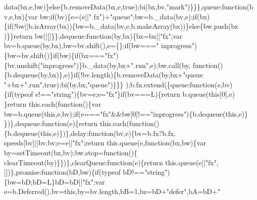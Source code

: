 \begin{DoxyCode}
      data(bx,e,bw)\}\textcolor{keywordflow}{else}\{b.removeData(bx,e,true);bi(bx,bv,\textcolor{stringliteral}{"mark"})\}\}\},queue:\textcolor{keyword}{function}(bv,e,bx)\{var bw;\textcolor{keywordflow}{if}(bv)\{e=(e||\textcolor{stringliteral}{"
      fx"})+\textcolor{stringliteral}{"queue"};bw=b.\_data(bv,e);\textcolor{keywordflow}{if}(bx)\{\textcolor{keywordflow}{if}(!bw||b.isArray(bx))\{bw=b.\_data(bv,e,b.makeArray(bx))\}\textcolor{keywordflow}{else}\{bw.push(bx
      )\}\}\textcolor{keywordflow}{return} bw||[]\}\},dequeue:\textcolor{keyword}{function}(by,bx)\{bx=bx||\textcolor{stringliteral}{"fx"};var bv=b.queue(by,bx),bw=bv.shift(),e=\{\};\textcolor{keywordflow}{if}(bw===\textcolor{stringliteral}{"
      inprogress"})\{bw=bv.shift()\}\textcolor{keywordflow}{if}(bw)\{\textcolor{keywordflow}{if}(bx===\textcolor{stringliteral}{"fx"})\{bv.unshift(\textcolor{stringliteral}{"inprogress"})\}b.\_data(by,bx+\textcolor{stringliteral}{".run"},e);bw.call(by,\textcolor{keyword}{
      function}()\{b.dequeue(by,bx)\},e)\}\textcolor{keywordflow}{if}(!bv.length)\{b.removeData(by,bx+\textcolor{stringliteral}{"queue "}+bx+\textcolor{stringliteral}{".run"},\textcolor{keyword}{true});bi(by,bx,\textcolor{stringliteral}{"queue"})\}\}\}
      );b.fn.extend(\{queue:\textcolor{keyword}{function}(e,bv)\{\textcolor{keywordflow}{if}(typeof e!==\textcolor{stringliteral}{"string"})\{bv=e;e=\textcolor{stringliteral}{"fx"}\}\textcolor{keywordflow}{if}(bv===L)\{\textcolor{keywordflow}{return} b.queue(\textcolor{keyword}{this}[0],e)
      \}\textcolor{keywordflow}{return} this.each(\textcolor{keyword}{function}()\{var bw=b.queue(\textcolor{keyword}{this},e,bv);\textcolor{keywordflow}{if}(e===\textcolor{stringliteral}{"fx"}&&bw[0]!==\textcolor{stringliteral}{"inprogress"})\{b.dequeue(\textcolor{keyword}{this},e)\}
      \})\},dequeue:\textcolor{keyword}{function}(e)\{\textcolor{keywordflow}{return} this.each(\textcolor{keyword}{function}()\{b.dequeue(\textcolor{keyword}{this},e)\})\},delay:\textcolor{keyword}{function}(bv,e)\{bv=b.fx?b.fx.
      speeds[bv]||bv:bv;e=e||\textcolor{stringliteral}{"fx"};\textcolor{keywordflow}{return} this.queue(e,\textcolor{keyword}{function}(bx,bw)\{var by=setTimeout(bx,bv);bw.stop=\textcolor{keyword}{function}()\{
      clearTimeout(by)\}\})\},clearQueue:\textcolor{keyword}{function}(e)\{\textcolor{keywordflow}{return} this.queue(e||\textcolor{stringliteral}{"fx"},[])\},promise:\textcolor{keyword}{function}(bD,bw)\{\textcolor{keywordflow}{if}(typeof 
      bD!==\textcolor{stringliteral}{"string"})\{bw=bD;bD=L\}bD=bD||\textcolor{stringliteral}{"fx"};var e=b.Deferred(),bv=\textcolor{keyword}{this},by=bv.length,bB=1,bz=bD+\textcolor{stringliteral}{"defer"},bA=bD+\textcolor{stringliteral}{"
}
\end{DoxyCode}
